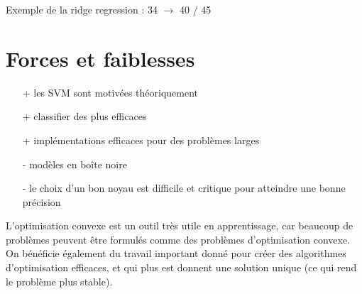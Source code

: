 Exemple de la ridge regression : 34 $\rightarrow$ 40 / 45

\section{Forces et faiblesses}

\begin{itemize}
	\item[+] les SVM sont motivées théoriquement
	\item[+] classifier des plus efficaces
	\item[+] implémentations efficaces pour des problèmes larges
	\item[-] modèles en boîte noire
	\item[-] le choix d'un bon noyau est difficile et critique pour atteindre une bonne précision
\end{itemize}

L'optimisation convexe est un outil très utile en apprentissage, car beaucoup de problèmes peuvent être formulés comme des problèmes d'optimisation convexe. On bénéficie également du travail important donné pour créer des algorithmes d'optimisation efficaces, et qui plus est donnent une solution unique (ce qui rend le problème plus stable).